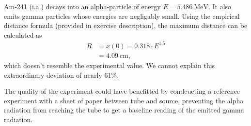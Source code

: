 Am-241 (i.a.) decays into an alpha-particle of energy $E=\SI{5.486}{\mega\electronvolt}$.
It also emits gamma particles whose energies are negligably small.
Using the empirical distance formula (provided in exercise description), the maximum distance can be calculated as
\begin{align*}
	R &= x(0) = \num{0.318}\cdot E^{\num{1.5}} \\
	&=\SI{4.09}{\centi\meter},
\end{align*}
which doesn't resemble the experimental value.
We cannot explain this extraordinary deviation of nearly \num{61}\%.

The quality of the experiment could have benefitted by condcucting a reference experiment with a sheet of paper between tube and source, preventing the alpha radiation from reaching the tube to get a baseline reading of the emitted gamma radiation.
